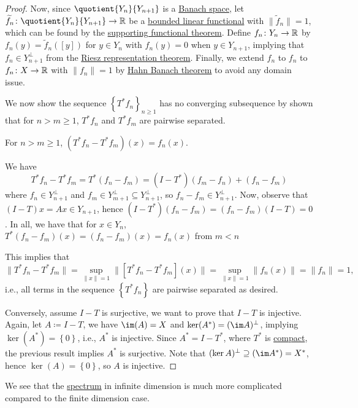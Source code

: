 \begin{proof}
	Now, since \(\quotient{Y_n}{Y_{n+1}} \) is a \hyperref[def:Banach-space]{Banach space}, let \(\widetilde{f} _n \colon \quotient{Y_n}{Y_{n+1}} \to  \mathbb{\MakeUppercase{r}} \) be a \hyperref[def:bounded-linear-functional]{bounded linear functional} with \(\lVert \widetilde{f} _n \rVert=1 \), which can be found by the \hyperref[thm:supporting-functional]{supporting functional theorem}. Define \(f_{n} \colon Y_n \to  \mathbb{\MakeUppercase{r}} \) by \(f_n (y) = \widetilde{f} _n([y])\) for \(y\in Y_n\) with \(f_n(y) = 0\) when \(y\in Y_{n+1}\), implying that \(f_n \in Y _{n+1}^{\perp}\) from the \hyperref[thm:Riesz-representation]{Riesz representation theorem}. Finally, we extend \(f_n\) to \(f_{n} \) to \(f_{n} \colon X\to \mathbb{\MakeUppercase{r}} \) with \(\lVert f_{n} \rVert = 1\) by \hyperref[thm:Hahn-Banach]{Hahn Banach theorem} to avoid any domain issue.

	We now show the sequence \(\left\{ T^{\ast} f_{n}  \right\} _{n\geq 1}\) has no converging subsequence by shown that for \(n > m \geq 1\), \(T^{\ast} f_n\) and \(T^{\ast} f_m\) are pairwise separated.

	\begin{claim}
		For \(n > m \geq 1\), \((T^{\ast} f_n - T^{\ast} f_m)(x) = f_n (x)\).
	\end{claim}
	\begin{explanation}
		We have
		\[
			T^{\ast} f_{n} - T^{\ast} f_m= T^{\ast} (f_{n} - f_{m}) = (I-T^{\ast} )(f_m-f_{n})+ (f_{n} -f_{m})
		\]
		where \(f_n\in Y^{\perp} _{n+1}\) and \(f_m\in Y^{\perp} _{m+1} \subseteq Y^{\perp} _{n+1}\), so \(f_n - f_m\in Y^{\perp} _{n+1}\). Now, observe that \((I-T)x = Ax\in Y_{n+1}\), hence \((I-T^{\ast} )(f_n - f_m) = (f_n - f_m)(I-T) = 0\). In all, we have that for \(x\in Y_n\), \(T^{\ast} (f_{n} - f_m)(x) = (f_n - f_m)(x)=f_n(x)\) from \(m < n\)
	\end{explanation}
	This implies that
	\[
		\lVert T^{\ast} f_n - T^{\ast} f_m \rVert
		= \sup _{\lVert x \rVert = 1} \lVert [T^{\ast} f_n - T^{\ast} f_m] (x)\rVert
		= \sup _{\lVert x \rVert = 1} \lVert f_n(x) \rVert
		= \lVert f_n \rVert
		= 1,
	\]
	i.e., all terms in the sequence \(\left\{ T^{\ast} f_n \right\} \) are pairwise separated as desired.

	Conversely, assume \(I-T\) is surjective, we want to prove that \(I-T\) is injective. Again, let \(A\coloneqq I-T\), we have \(\im(A) = X\) and \(\ker(A^{\ast} )= (\im A)^{\perp} \), implying \(\ker(A^{\ast} ) = \left\{ 0\right\} \), i.e., \(A^{\ast} \) is injective. Since \(A^{\ast} = I-T^{\ast} \), where \(T^{\ast} \) is \hyperref[def:compact-op]{compact}, the previous result implies \(A^{\ast} \) is surjective. Note that \((\ker A)^{\perp} \supseteq (\im A^{\ast} )= X^{\ast}\), hence \(\ker(A) = \left\{ 0 \right\} \), so \(A\) is injective.
\end{proof}

We see that the \hyperref[def:spectrum-point]{spectrum} in infinite dimension is much more complicated compared to the finite dimension case.